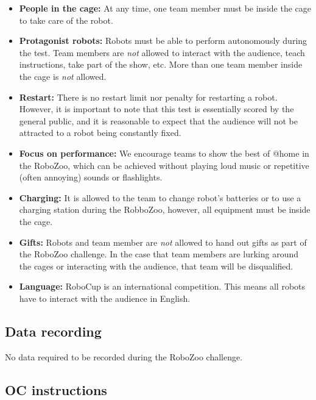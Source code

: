 \begin{itemize}
\item \textbf{People in the cage:} At any time, one team member must be inside the cage to take care of the robot. 

\item \textbf{Protagonist robots:} Robots must be able to perform autonomously during the test. Team members are \emph{not} allowed to interact with the audience, teach instructions, take part of the show, etc. More than one team member inside the cage is \emph{not} allowed.

\item \textbf{Restart:} There is no restart limit nor penalty for restarting a robot. However, it is important to note that this test is essentially scored by the general public, and it is reasonable to expect that the audience will not be attracted to a robot being constantly fixed. 

\item \textbf{Focus on performance:} We encourage teams to show the best of @home in the RoboZoo, which can be achieved without playing loud music or repetitive (often annoying) sounds or flashlights. 

\item \textbf{Charging:} It is allowed to the team to change robot's batteries or to use a charging station during the RobboZoo, however, all equipment must be inside the cage. 

\item \textbf{Gifts:} Robots and team member are \emph{not} allowed to hand out gifts as part of the RoboZoo challenge. In the case that team members are lurking around the cages or interacting with the audience, that team will be disqualified.

\item \textbf{Language:} RoboCup is an international competition. This means all robots have to interact with the audience in English.
\end{itemize}

\subsection{Data recording}
No data required to be recorded during the RoboZoo challenge.

\subsection{OC instructions}

